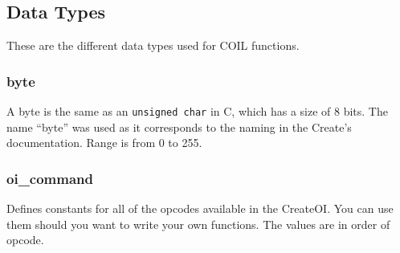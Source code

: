\documentclass {article}
\begin{document}
\subsection {Data Types} \hypertarget{datatypes}{} 
These are the different data types used for COIL functions.

\subsubsection {byte} \hypertarget{oibyte}{}
A byte is the same as an {\tt unsigned char} in C, which has a size of 8 bits.  The name ``byte''
was used as it corresponds to the naming in the Create's documentation.  Range is from 0 to 255.

\subsubsection {oi\_command} \hypertarget{oicommand}{}
Defines constants for all of the opcodes available in the CreateOI.  You can use them should you
want to write your own functions.  The values are in order of opcode.
\end{document}
